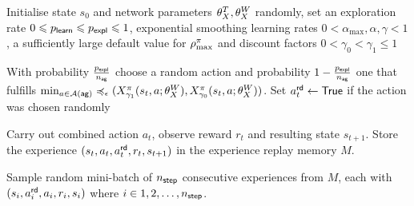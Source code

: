\documentclass[envcountsame]{llncs}
\begin{document}
\begin{algorithm}[t!]
  \begin{algorithmic}[1]
    \State{}Initialise state \(s_{0}\) and network parameters \(\theta_X^{T}, \theta_X^{W}\) randomly,
    set an exploration rate \(0 \leqslant p_{\mathsf{learn}} \leqslant p_{\mathsf{expl}} \leqslant 1\), exponential
    smoothing learning rates \(0 < \alpha_{\max}, \alpha, \gamma < 1\), a sufficiently large default
    value for \(\rho_{\max}^{\pi}\) and discount factors \(0 < \gamma_{0} < \gamma_{1} \leqslant
    1\)
    \State{}%
    \begin{minipage}[t]{\dimexpr\textwidth-\leftmargin-\labelsep-\labelwidth-\leftmargin+2pt}
      With probability \(\frac{p_{\mathsf{expl}}}{n_{\mathsf{ag}}}\) choose a random action and
      probability \(1-\frac{p_{\mathsf{expl}}}{n_{\mathsf{ag}}}\) one that fulfills
      \(\min_{a \in \mathcal{A}(\mathsf{ag})}\preccurlyeq_{\epsilon}(X^{\pi}_{\gamma_{1}}(s_{t},a; \theta_X^{W}{}),X^\pi_ {\gamma_{0}}(s_{t},a;
      \theta_X^{W}{}))\). Set \(a_{t}^{\mathsf{rd}} \gets \mathsf{True}\) if the action was chosen randomly
    \end{minipage}
    \EndFor
    \State{}%
    \begin{minipage}[t]{\dimexpr\textwidth-\leftmargin-\labelsep-\labelwidth}
    Carry out combined action \(a_{t}\), observe reward \(r_{t}\) and resulting state \(s_{t+1}\).
    Store the experience \((s_{t}, a_{t}, a_{t}^{\mathsf{rd}}, r_{t}, s_{t+1})\) in the experience replay
    memory \(M\).
    \end{minipage}
    \State{}%
    \begin{minipage}[t]{\dimexpr\textwidth-\leftmargin-\labelsep-\labelwidth-\leftmargin+2pt}
      Sample random mini-batch of \(n_{\mathsf{step}}\) consecutive experiences from \(M\), each with
      \((s_{i}, a_{i}^{\mathsf{rd}}, a_{i}, r_{i}, s_{i})\) where \(i \in {1,2,\ldots,n_{\mathsf{step}}}\).
    \end{minipage}

\end{algorithmic}
\end{algorithm}
\end{document}
